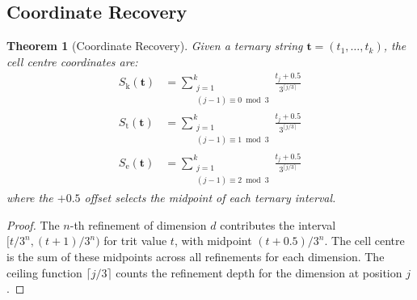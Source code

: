 \documentclass[11pt,twocolumn,a4paper]{article}
\newtheorem{theorem}{Theorem}[section]
\theoremstyle{definition}
\theoremstyle{remark}
\newcommand{\Sk}{S_{\mathrm{k}}}
\newcommand{\St}{S_{\mathrm{t}}}
\newcommand{\Se}{S_{\mathrm{e}}}
\begin{document}
\subsection{Coordinate Recovery}

\begin{theorem}[Coordinate Recovery]
\label{thm:recovery}
Given a ternary string $\mathbf{t} = (t_1, \ldots, t_k)$, the cell centre coordinates are:
\begin{align}
\Sk(\mathbf{t}) &= \sum_{\substack{j=1 \\ (j-1) \equiv 0 \bmod 3}}^{k} \frac{t_j + 0.5}{3^{\lceil j/3 \rceil}} \label{eq:recovery_sk} \\
\St(\mathbf{t}) &= \sum_{\substack{j=1 \\ (j-1) \equiv 1 \bmod 3}}^{k} \frac{t_j + 0.5}{3^{\lceil j/3 \rceil}} \label{eq:recovery_st} \\
\Se(\mathbf{t}) &= \sum_{\substack{j=1 \\ (j-1) \equiv 2 \bmod 3}}^{k} \frac{t_j + 0.5}{3^{\lceil j/3 \rceil}} \label{eq:recovery_se}
\end{align}
where the $+0.5$ offset selects the midpoint of each ternary interval.
\end{theorem}

\begin{proof}
The $n$-th refinement of dimension $d$ contributes the interval $[t/3^n, (t+1)/3^n)$ for trit value $t$, with midpoint $(t + 0.5)/3^n$. The cell centre is the sum of these midpoints across all refinements for each dimension. The ceiling function $\lceil j/3 \rceil$ counts the refinement depth for the dimension at position $j$.
\end{proof}
\end{document}
